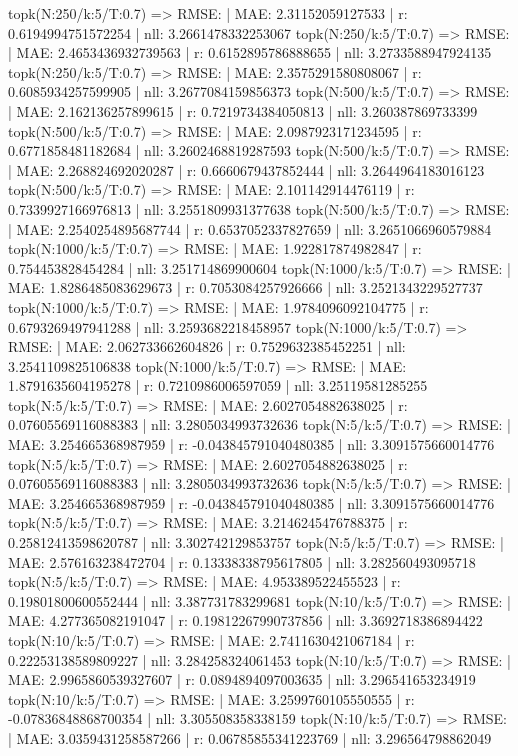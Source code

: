 topk(N:250/k:5/T:0.7) => RMSE: | MAE: 2.31152059127533 | r: 0.6194994751572254 | nll: 3.2661478332253067
topk(N:250/k:5/T:0.7) => RMSE: | MAE: 2.4653436932739563 | r: 0.6152895786888655 | nll: 3.2733588947924135
topk(N:250/k:5/T:0.7) => RMSE: | MAE: 2.3575291580808067 | r: 0.6085934257599905 | nll: 3.2677084159856373
topk(N:500/k:5/T:0.7) => RMSE: | MAE: 2.162136257899615 | r: 0.7219734384050813 | nll: 3.260387869733399
topk(N:500/k:5/T:0.7) => RMSE: | MAE: 2.0987923171234595 | r: 0.6771858481182684 | nll: 3.2602468819287593
topk(N:500/k:5/T:0.7) => RMSE: | MAE: 2.268824692020287 | r: 0.6660679437852444 | nll: 3.2644964183016123
topk(N:500/k:5/T:0.7) => RMSE: | MAE: 2.101142914476119 | r: 0.7339927166976813 | nll: 3.2551809931377638
topk(N:500/k:5/T:0.7) => RMSE: | MAE: 2.2540254895687744 | r: 0.6537052337827659 | nll: 3.2651066960579884
topk(N:1000/k:5/T:0.7) => RMSE: | MAE: 1.922817874982847 | r: 0.754453828454284 | nll: 3.251714869900604
topk(N:1000/k:5/T:0.7) => RMSE: | MAE: 1.8286485083629673 | r: 0.7053084257926666 | nll: 3.2521343229527737
topk(N:1000/k:5/T:0.7) => RMSE: | MAE: 1.9784096092104775 | r: 0.6793269497941288 | nll: 3.2593682218458957
topk(N:1000/k:5/T:0.7) => RMSE: | MAE: 2.062733662604826 | r: 0.7529632385452251 | nll: 3.2541109825106838
topk(N:1000/k:5/T:0.7) => RMSE: | MAE: 1.8791635604195278 | r: 0.7210986006597059 | nll: 3.25119581285255
topk(N:5/k:5/T:0.7) => RMSE: | MAE: 2.6027054882638025 | r: 0.07605569116088383 | nll: 3.2805034993732636
topk(N:5/k:5/T:0.7) => RMSE: | MAE: 3.254665368987959 | r: -0.043845791040480385 | nll: 3.3091575660014776
topk(N:5/k:5/T:0.7) => RMSE: | MAE: 2.6027054882638025 | r: 0.07605569116088383 | nll: 3.2805034993732636
topk(N:5/k:5/T:0.7) => RMSE: | MAE: 3.254665368987959 | r: -0.043845791040480385 | nll: 3.3091575660014776
topk(N:5/k:5/T:0.7) => RMSE: | MAE: 3.2146245476788375 | r: 0.25812413598620787 | nll: 3.302742129853757
topk(N:5/k:5/T:0.7) => RMSE: | MAE: 2.576163238472704 | r: 0.13338338795617805 | nll: 3.282560493095718
topk(N:5/k:5/T:0.7) => RMSE: | MAE: 4.953389522455523 | r: 0.19801800600552444 | nll: 3.387731783299681
topk(N:10/k:5/T:0.7) => RMSE: | MAE: 4.277365082191047 | r: 0.19812267990737856 | nll: 3.3692718386894422
topk(N:10/k:5/T:0.7) => RMSE: | MAE: 2.7411630421067184 | r: 0.22253138589809227 | nll: 3.284258324061453
topk(N:10/k:5/T:0.7) => RMSE: | MAE: 2.9965860539327607 | r: 0.0894894097003635 | nll: 3.296541653234919
topk(N:10/k:5/T:0.7) => RMSE: | MAE: 3.2599760105550555 | r: -0.07836848868700354 | nll: 3.305508358338159
topk(N:10/k:5/T:0.7) => RMSE: | MAE: 3.0359431258587266 | r: 0.06785855341223769 | nll: 3.296564798862049

